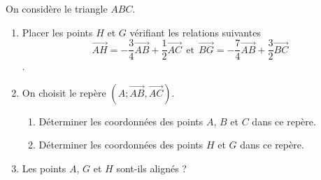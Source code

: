 
On considère le triangle $ABC$. 
\begin{enumerate}
\item Placer les points $H$ et $G$ vérifiant les relations suivantes $$\overrightarrow{AH}=-\frac{3}{4}\overrightarrow{AB}+\frac{1}{2}\overrightarrow{AC} ~~ \text{et} ~~ \overrightarrow{BG}=-\frac{7}{4}\overrightarrow{AB}+\frac{3}{2}\overrightarrow{BC}$$.
\item On choisit le repère $\left( A; \overrightarrow{AB},\overrightarrow{AC} \right)$.
\begin{enumerate}
\item Déterminer les coordonnées des points $A$, $B$ et $C$ dans ce repère.
\item Déterminer les coordonnées des points $H$ et $G$ dans ce repère.
 \end{enumerate}
 \item Les points $A$, $G$ et $H$ sont-ils alignés ?
\end{enumerate}